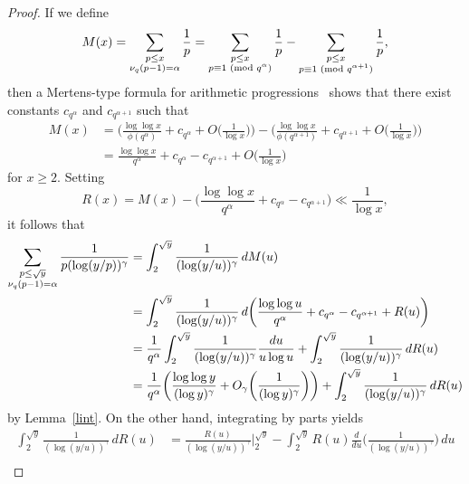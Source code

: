 \documentclass[12pt,reqno]{amsart}
\theoremstyle{definition}
\renewcommand{\mod}[1]{{\ifmmode\text{\rm\ (mod~$#1$)}\else\discretionary{}{}{\hbox{ }}\rm(mod~$#1$)\fi}}
\begin{document}
\begin{proof}
If we define
\begin{equation} \label{Mx def}
M(x)=\sum_{\substack{p\le x\\\nu_q(p-1)=\alpha}} \frac1p = \sum_{\substack{p\le x\\p\equiv 1\mod{q^\alpha}}} \frac1p - \sum_{\substack{p\le x\\p\equiv 1\mod {q^{\alpha+1}}}} \frac1p,
\end{equation}
then a Mertens-type formula for arithmetic progressions~\cite[Corollary~4.12]{MV} shows that there exist constants $c_{q^\alpha}$ and $c_{q^{\alpha+1}}$ such that
\begin{align*}
M(x) &= \bigg( \frac{\log\log x}{\phi(q^\alpha)} + c_{q^\alpha} + O\bigg( \frac1{\log x} \bigg) \bigg) - \bigg( \frac{\log\log x}{\phi(q^{\alpha+1})} + c_{q^{\alpha+1}} + O\bigg( \frac1{\log x} \bigg) \bigg) \\
&= \frac{\log\log x}{q^\alpha} + c_{q^\alpha} - c_{q^{\alpha+1}} + O\bigg( \frac1{\log x} \bigg)
\end{align*}
for $x\ge2$. Setting
\begin{equation} \label{Rx def}
R(x) = M(x) - \bigg( \frac{\log\log x}{q^\alpha} + c_{q^\alpha} - c_{q^{\alpha+1}} \bigg) \ll \frac1{\log x},
\end{equation}
it follows that
\begin{align}
\sum_{\substack{p\le \sqrt y\\ \nu_q(p-1)=\alpha}} \frac1{p(\log(y/p))^\gamma} &= \int_2^{\sqrt y} \frac1{(\log(y/u))^\gamma} \,dM(u) \notag \\
&=\int_2^{\sqrt y} \frac1{(\log(y/u))^\gamma} \,d\bigg( \frac{\log\log u}{q^\alpha} + c_{q^\alpha} - c_{q^{\alpha+1}} + R(u) \bigg) \notag \\
&=\frac 1{q^\alpha} \int_2^{\sqrt y} \frac1{(\log(y/u))^\gamma} \frac {du}{u\log u} + \int_2^{\sqrt y} \frac1{(\log(y/u))^\gamma} \,dR(u) \notag \\
&=\frac 1{q^\alpha} \bigg( \frac{\log\log y}{(\log y)^\gamma}+O_\gamma\bigg( \frac1{(\log y)^\gamma}\bigg) \bigg) + \int_2^{\sqrt y} \frac1{(\log(y/u))^\gamma} \,dR(u) \label{RS int}
\end{align}
by Lemma~\ref{lint}.
On the other hand, integrating by parts yields
\begin{align*}
\int_2^{\sqrt y} \frac1{(\log(y/u))^\gamma} \,dR(u) &= \frac{R(u)}{(\log(y/u))^\gamma} \bigg|_2^{\sqrt y} - \int_2^{\sqrt y} R(u) \frac d{du} \bigg( \frac1{(\log(y/u))^\gamma} \bigg) \,du \\

\end{align*}
\end{proof}
\end{document}
